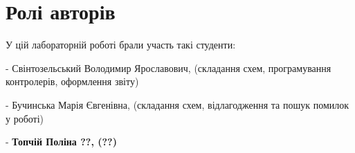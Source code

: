 \chapter{Ролі авторів} 
\label{chap:second}

У цій лабораторній роботі брали участь такі студенти:

- Свінтозельський Володимир Ярославович, (складання схем, програмування контролерів, оформлення звіту)

- Бучинська Марія Євгенівна, (складання схем, відлагодження та пошук помилок у роботі)

- \textbf{Топчій Поліна ??, (??)}
